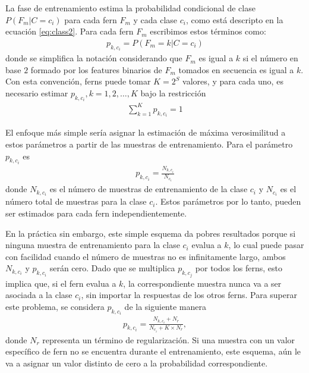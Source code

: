 		La fase de entrenamiento estima la probabilidad condicional de clase $P(F_m|C=c_i)$ para cada fern $F_m$	 y cada clase $c_i$, como está descripto en la ecuación \ref{eq:class2}. Para cada fern $F_m$ escribimos estos términos como:
		\begin{align}
			p_{k,c_i} = P(F_m = k | C = c_i)
		\end{align}
		donde se simplifica la notación considerando que $F_m$ es igual a $k$ si el número en base $2$ formado por los features binarios de $F_m$ tomados en secuencia es igual a $k$. Con esta convención, ferns puede tomar $K=2^S$ valores, y para cada uno, es necesario estimar $p_{k,c_i}, k=1,2,\dots,K$ bajo la restricción
		\begin{align*}
			\sum_{k=1}^Kp_{k,c_i} = 1
		\end{align*}		
		
		El enfoque más simple sería asignar la estimación de máxima verosimilitud a estos parámetros a partir de las muestras de entrenamiento. Para el parámetro $p_{k,c_i}$ es
		\begin{align*}
			p_{k,c_i} = \frac{N_{k,c_i}}{N_{c_i}}
		\end{align*}
		donde $N_{k,c_i}$ es el número de muestras de entrenamiento de la clase $c_i$ y $N_{c_i}$ es el número total de muestras para la clase $c_i$. Estos parámetros por lo tanto, pueden ser estimados para cada fern independientemente.
		
		En la práctica sin embargo, este simple esquema da pobres resultados porque si ninguna muestra de entrenamiento para la clase $c_i$ evalua a $k$, lo cual puede pasar con facilidad cuando el número de muestras no es infinitamente largo, ambos $N_{k,c_i}$ y $p_{k,c_i}$ serán cero. Dado que se multiplica $p_{k,c_j}$ por todos los ferns, esto implica que, si el fern evalua a $k$, la correspondiente muestra nunca va a ser asociada a la clase $c_i$, sin importar la respuestas de los otros ferns. Para superar este problema, se considera $p_{k,c_i}$ de la siguiente manera
		\begin{align*}
			\label{eq:Laplace-Smoothing}
			p_{k,c_i} = \frac{N_{k,c_i} + N_r}{N_{c_i} + K \times N_r},
		\end{align*}
		donde $N_r$ representa un término de regularización. Si una muestra con un valor específico de fern no se encuentra durante el entrenamiento, este esquema, aún le va a asignar un valor distinto de cero a la probabilidad correspondiente.
